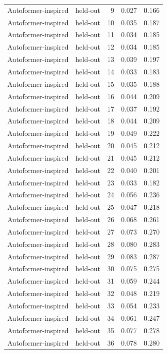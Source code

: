 \begin{tabular}{llrrr}
Autoformer-inspired & held-out & 9 & 0.027 & 0.166 \\
Autoformer-inspired & held-out & 10 & 0.035 & 0.187 \\
Autoformer-inspired & held-out & 11 & 0.034 & 0.185 \\
Autoformer-inspired & held-out & 12 & 0.034 & 0.185 \\
Autoformer-inspired & held-out & 13 & 0.039 & 0.197 \\
Autoformer-inspired & held-out & 14 & 0.033 & 0.183 \\
Autoformer-inspired & held-out & 15 & 0.035 & 0.188 \\
Autoformer-inspired & held-out & 16 & 0.044 & 0.209 \\
Autoformer-inspired & held-out & 17 & 0.037 & 0.192 \\
Autoformer-inspired & held-out & 18 & 0.044 & 0.209 \\
Autoformer-inspired & held-out & 19 & 0.049 & 0.222 \\
Autoformer-inspired & held-out & 20 & 0.045 & 0.212 \\
Autoformer-inspired & held-out & 21 & 0.045 & 0.212 \\
Autoformer-inspired & held-out & 22 & 0.040 & 0.201 \\
Autoformer-inspired & held-out & 23 & 0.033 & 0.182 \\
Autoformer-inspired & held-out & 24 & 0.056 & 0.236 \\
Autoformer-inspired & held-out & 25 & 0.047 & 0.218 \\
Autoformer-inspired & held-out & 26 & 0.068 & 0.261 \\
Autoformer-inspired & held-out & 27 & 0.073 & 0.270 \\
Autoformer-inspired & held-out & 28 & 0.080 & 0.283 \\
Autoformer-inspired & held-out & 29 & 0.083 & 0.287 \\
Autoformer-inspired & held-out & 30 & 0.075 & 0.275 \\
Autoformer-inspired & held-out & 31 & 0.059 & 0.244 \\
Autoformer-inspired & held-out & 32 & 0.048 & 0.219 \\
Autoformer-inspired & held-out & 33 & 0.054 & 0.233 \\
Autoformer-inspired & held-out & 34 & 0.061 & 0.247 \\
Autoformer-inspired & held-out & 35 & 0.077 & 0.278 \\
Autoformer-inspired & held-out & 36 & 0.078 & 0.280 \\

\end{tabular}
